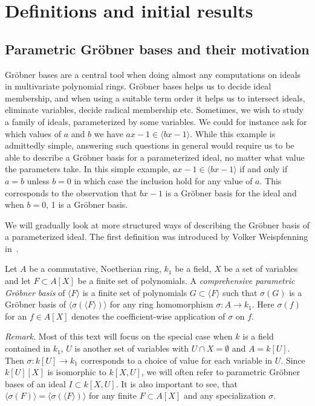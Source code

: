 \section{Definitions and initial results}

\subsection{Parametric Gröbner bases and their motivation}
Gröbner bases are a central tool when doing almost any computations on ideals in multivariate polynomial rings. Gröbner bases helps us to decide ideal membership, and when using a suitable term order it helps us to intersect ideals, eliminate variables, decide radical membership etc. Sometimes, we wish to study a family of ideals, parameterized by some variables. We could for instance ask for which values of $a$ and $b$ we have $ax - 1 \in \langle bx - 1 \rangle$. While this example is admittedly simple, answering such questions in general would require us to be able to describe a Gröbner basis for a parameterized ideal, no matter what value the parameters take. In this simple example, $ax - 1 \in \langle bx - 1 \rangle$ if and only if $a = b$ unless $b = 0$ in which case the inclusion hold for any value of $a$. This corresponds to the observation that $bx - 1$ is a Gröbner basis for the ideal and when $b=0$, 1 is a Gröbner basis.

We will gradually look at more structured ways of describing the Gröbner basis of a parameterized ideal. The first definition was introduced by Volker Weispfenning in~\cite{Weispfenning}.

\begin{definition}\label{def:par_grb}
  Let $A$ be a commutative, Noetherian ring, $k_{1}$ be a field, $X$ be a set of variables and let $F \subset A[X]$ be a finite set of polynomials. A \textit{comprehensive parametric Gröbner basis} of $\langle F \rangle$ is a finite set of polynomials $G \subset \langle F \rangle$ such that $\sigma(G)$ is a Gröbner basis of $\langle \sigma(\langle F \rangle) \rangle$ for any ring homomorphism $\sigma : A \to k_{1}$. Here $\sigma(f)$ for an $f \in A[X]$ denotes the coefficient-wise application of $\sigma$ on $f$.
\end{definition}
\textit{Remark. }Most of this text will focus on the special case when $k$ is a field contained in $k_{1}$, $U$ is another set of variables with $U \cap X = \emptyset$ and $A = k[U]$. Then $\sigma : k[U] \to k_{1}$ corresponds to a choice of value for each variable in $U$. Since $k[U][X]$ is isomorphic to $k[X, U]$, we will often refer to parametric Gröbner bases of an ideal $I \subset k[X, U]$. It is also important to see, that $\langle \sigma(F) \rangle = \langle \sigma(\langle F \rangle) \rangle$ for any finite $F \subset A[X]$ and any specialization $\sigma$.

